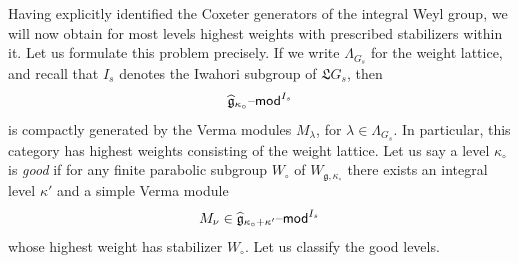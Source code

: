 \documentclass[11pt,reqno]{amsart}
\newcommand{\fL}{\mathfrak{L}}
\newcommand{\fg}{\mathfrak{g}}
\theoremstyle{remark}
\numberwithin{equation}{section}
\renewcommand{\mod}{\text{\textendash}\mathsf{mod}}
\begin{document}
\subsubsection{}\label{sss:good-defin}
Having explicitly identified the Coxeter generators of the integral Weyl group, 
we will now obtain for 
most levels highest weights with prescribed stabilizers within it. Let us 
formulate this problem precisely. If we write $\Lambda_{G_s}$ for the weight 
lattice, and 
recall that $I_s$ denotes the Iwahori subgroup of $\fL G_s$, then
%
\[\widehat{\fg}_{\kappa_{\circ}}\mod^{I_s}\]
%
is compactly generated by the Verma modules $M_\lambda$, for $\lambda \in 
\Lambda_{G_s}$. 
In particular, this category has highest weights consisting of the weight 
lattice. Let us say a level $\kappa_{\circ}$ is {\em good} if for any finite
parabolic subgroup $W_\circ$ of $W_{\fg, \kappa_\circ}$ there exists 
an integral 
level $\kappa'$ and a simple Verma module 
%
\[ M_\nu \in \widehat{\fg}_{\kappa_{\circ} + \kappa'}\mod^{I_s}
\] 
%
whose highest weight has stabilizer $W_\circ$. Let us classify the good 
levels. 
\end{document}
